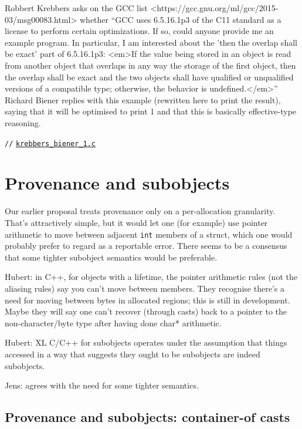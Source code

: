 \documentclass[acmsmall,review,screen]{acmart}\settopmatter{printfolios=true,printccs=false,printacmref=false}
\newcommand{\mytesturl}[1]{https://cerberus.cl.cam.ac.uk/cerberus?defacto/#1}
\newcommand{\mytestlink}[2]{\href{\mytesturl{#1}}{#2}}
\newcommand{\mylsttestlink}[1]{\mytestlink{#1}{\lstinline{#1}}}
\newcommand{\mylistingmargin}{5mm}
\newcommand{\myfooexample}[3]{{\vspace*{-0.0\baselineskip}\par{\noindent\small\hspace*{\mylistingmargin}\lstinline{//} \mylsttestlink{#2}\vspace*{0.25\baselineskip}\par}}}
\begin{document}
Robbert Krebbers asks on the GCC
list <https://gcc.gnu.org/ml/gcc/2015-03/msg00083.html>
whether ``GCC uses 6.5.16.1p3 of the C11 standard as a license
 to perform certain optimizations. If so, could anyone provide me an example
 program.
 In particular, I am interested about the 'then the overlap shall be exact'
 part of 6.5.16.1p3:
   <em>If the value being stored in an object is read from another
   object that overlaps in any way the storage of the first
   object, then the overlap shall be exact and the two objects
   shall have qualified or unqualified versions of a compatible
   type; otherwise, the behavior is undefined.</em>''
Richard Biener replies with this example (rewritten here to print the
result), saying that it will be optimised to print 1 and that this is
basically effective-type reasoning. 

\myfooexample{../../../rsem/csem/charon2/tests/de_facto_memory_model/}{krebbers_biener_1.c}{http://www.cl.cam.ac.uk/users/pes20/cerberus/tests/krebbers_biener_1.c.html}



\section{Provenance and subobjects}

Our earlier proposal treats provenance only on a per-allocation
granularity.  That's attractively simple, but it would let one (for
example) use pointer arithmetic to move between adjacent \lstinline{int} members
of a struct, which one would probably prefer to regard as a reportable
error.  There seems to be a consensus that some tighter subobject
semantics would be preferable.

Hubert: in C++, for objects with a lifetime, the pointer arithmetic
rules (not the aliasing rules) say you can't move between
members. They recognise there's a need for moving between bytes in
allocated regions; this is still in development. Maybe they will say
one can't recover (through casts) back to a pointer to the
non-character/byte type after having done char* arithmetic.

Hubert: XL C/C++ for subobjects operates under the assumption that
things accessed in a way that suggests they ought to be subobjects are
indeed subobjects.

Jens: agrees with the need for some tighter semantics.


\subsection{Provenance and subobjects: container-of casts}
\end{document}
